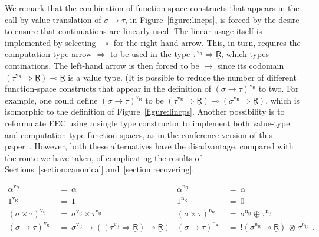 \documentclass{LMCS}
\newcommand{\comptype}[1]{\underline{#1}}
\newcommand{\CR}{\comptype{\mathsf{R}}}
\newcommand{\Vone}{1}
\newcommand{\Vprod}{\times}
\newcommand{\Vfun}{\to}
\newcommand{\lpop}{\multimap}
\newcommand{\Cfun}{\Rightarrow}
\newcommand{\Ccopower}[2]{! #1 \, {\otimes} \, #2}
\newcommand{\Czero}{\comptype{0}}
\newcommand{\Cplus}{\oplus}
\newcommand{\Lone}{1}
\newcommand{\Lprod}{\times}
\newcommand{\Lfun}{\to}
\newcommand{\cbvLincps}[1]{#1^{\mathrm{v_{\CR}}}}
\newcommand{\cbnLincps}[1]{#1^{\mathrm{n_{\CR}}}}
\begin{document}
We remark that the combination of function-space constructs that appears in the call-by-value translation
of $\sigma \Lfun \tau$, in Figure~\ref{figure:lincps},
is forced by the desire to ensure that continuations are
linearly used. The linear usage itself is implemented by selecting
$\lpop$ for the right-hand arrow. This, in turn, requires the 
computation-type arrow $\Cfun$ to be used in the 
type $\cbvLincps{\tau} \Cfun \CR$, which types continations.
The left-hand arrow is then forced to be $\Vfun$ since its
codomain $(\cbvLincps{\tau} \Cfun \CR) \lpop  \CR$ is a value type.
(It is possible to reduce the number of different
function-space constructs that appear in the definition of $\cbvLincps{(\sigma \Lfun \tau)}$
to two. For example, one could define $\cbvLincps{(\sigma \Lfun \tau)}$
to be $(\cbvLincps{\tau} \Cfun \CR) \lpop  (\cbvLincps{\sigma} \Cfun  \CR)$, which is
isomorphic to the definition of Figure~\ref{figure:lincps}. Another possibility is to reformulate
EEC using a single type constructor to implement both value-type and computation-type
function spaces, as in the conference version of this 
paper~\cite{EMS:fossacs}. However,
both these alternatives have the disadvantage, compared with the route we have taken,
of complicating the results of
Sections~\ref{section:canonical} and~\ref{section:recovering}.




\begin{figure*}[t] \begin{align*}
\cbvLincps{\alpha} \: & = \: \alpha & 
\cbnLincps{\alpha} \: & = \: \comptype{\alpha} \\
\cbvLincps{\Lone} \: & = \: \Vone & 
\cbnLincps{\Lone} \: & = \: \Czero \\
\cbvLincps{(\sigma \Lprod \tau)} \: & = \: \cbvLincps{\sigma} \Vprod \cbvLincps{\tau} &  
\cbnLincps{(\sigma \Lprod \tau)} \: & = \: \cbnLincps{\sigma} \Cplus \cbnLincps{\tau} \\
\cbvLincps{(\sigma \Lfun \tau)} \: & = \: \cbvLincps{\sigma} \Vfun ((\cbvLincps{\tau} \Cfun \CR) \lpop  \CR)
 &  \cbnLincps{(\sigma \Lfun \tau)} \: & = \: \Ccopower{(\cbnLincps{\sigma}  \lpop \CR)}{\cbnLincps{\tau}} \enspace .
\end{align*}
\caption{Cbv and cbn linear-use CPS translations of typed $\lambda$-calculus.}
\label{figure:lincps}
\end{figure*}
\end{document}
